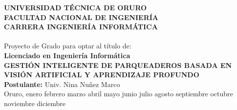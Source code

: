 \documentclass[12pt, letterpaper]{report}
\newcommand{\currentmonth}{%
    \ifcase\month
        \or enero%
        \or febrero%
        \or marzo%
        \or abril%
        \or mayo%
        \or junio%
        \or julio%
        \or agosto%
        \or septiembre%
        \or octubre%
        \or noviembre%
        \or diciembre%
    \fi
    \space \the\year
}
\begin{document}
\begin{titlepage}
	\centering
	{\Large \textbf{UNIVERSIDAD TÉCNICA DE ORURO}\\}
	{\large \textbf{FACULTAD NACIONAL DE INGENIERÍA}\\}
	{\large \textbf{CARRERA INGENIERÍA INFORMÁTICA}}\\[1cm]

	\\[1cm]

	{\large Proyecto de Grado para optar al título de:\\[0.2cm]
		\textbf{Licenciado en Ingeniería Informática}}\\[1cm]

	{\Large \textbf{GESTIÓN INTELIGENTE DE PARQUEADEROS BASADA EN VISIÓN ARTIFICIAL Y APRENDIZAJE PROFUNDO}}\\[1.5cm]


	{\large \textbf{Postulante:} Univ. Nina Nuñez Marco}\\[0.5cm]

	\vfill
    {\large Oruro, \currentmonth}

\end{titlepage}

\setcounter{page}{2}

\clearpage


\clearpage
\tableofcontents
\listoffigures
\listoftables
\clearpage

\clearpage

\renewcommand{\thechapter}{\Roman{chapter}}
\renewcommand{\thesection}{\arabic{chapter}.\arabic{section}}
\renewcommand{\thefigure}{\arabic{chapter}.\arabic{figure}}
\renewcommand{\theequation}{\arabic{chapter}.\arabic{equation}}
\renewcommand{\thetable}{\arabic{chapter}.\arabic{table}}







\clearpage
{}
\printbibliography

\clearpage

\end{document}
